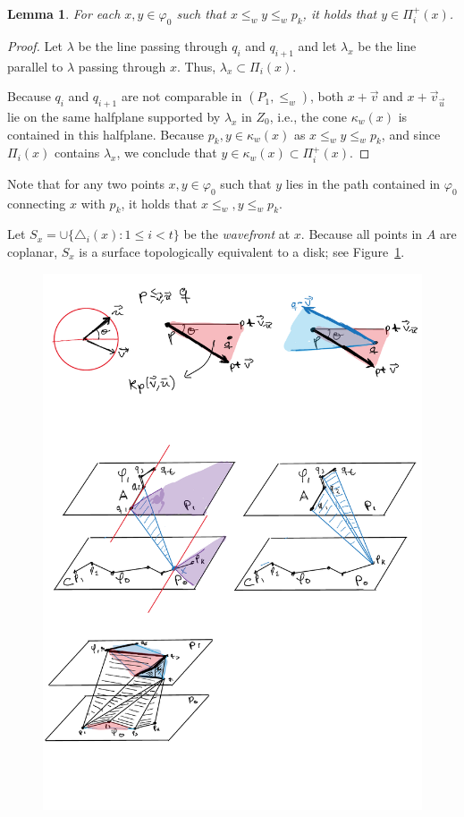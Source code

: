 \documentclass[a4paper, 11pt]{article}
\newtheorem{lemma}[theorem]{Lemma}
\newcommand{\ve}{{\ensuremath{\vec{v}}}}
\newcommand{\ue}{{\ensuremath{\vec{u}}}}
\newcommand{\we}{{\ensuremath{w}}}
\newcommand{\cone}[1]{\ensuremath{\kappa_{\we}(#1)}}
\newcommand{\lt}{\ensuremath{ \leq_{\we}}}
\begin{document}
\begin{lemma}\label{lemma:Same side of plane}
For each $x,y\in \varphi_0$ such that $x\lt y\lt p_k$, it holds that $y\in \Pi_i^+(x)$. 
\end{lemma}
\begin{proof}
Let $\lambda$ be the line passing through $q_i$ and $q_{i+1}$ and let $\lambda_x$ be the line parallel to $\lambda$ passing through $x$. Thus, $\lambda_x\subset \Pi_i(x)$.

Because $q_i$ and $q_{i+1}$ are not comparable in $(P_1, \lt)$, both $x+\ve$ and $x+\ve_\ue$ lie on the same halfplane supported by $\lambda_x$ in $Z_0$, i.e., the cone $\cone{x}$ is contained in this halfplane. 
Because $p_k, y\in \cone{x}$ as $x\lt y\lt p_k$, and since $\Pi_i(x)$ contains $\lambda_x$, 
we conclude that $y\in \cone{x}\subset \Pi^+_i(x)$.
\end{proof}

Note that for any two points $x,y\in \varphi_0$ such that $y$ lies in the path contained in $\varphi_0$ connecting $x$ with $p_k$,
it holds that $x\lt, y\lt p_k$.

Let $S_x = \cup\{\triangle_i(x) : 1\leq i< t\}$ be the \emph{wavefront} at $x$.
Because all points in $A$ are coplanar, $S_x$ is a surface topologically equivalent to a disk; see Figure~\ref{fig:Wavefronts}.

\begin{figure}[tb]
\centering
\includegraphics[width=1\textwidth]{img/Wavefronts.pdf}
\caption{\small }
\label{fig:Wavefronts}
\end{figure}
\end{document}
